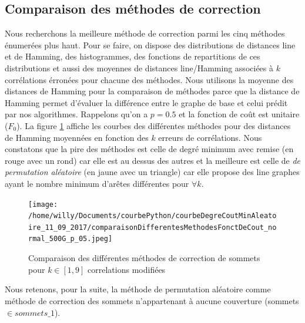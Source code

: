 \documentclass[onecolumn, 12pt]{book}
\begin{document}
\subsection{Comparaison des m\'ethodes de correction}
Nous recherchons la meilleure m\'ethode de correction parmi les cinq m\'ethodes \'enumer\'ees plus haut. 
Pour se faire, on dispose des distributions de distances line et de Hamming, des histogrammes, des fonctions de repartitions de ces distributions et aussi des moyennes de distances line/Hamming associ\'ees \`a $k$ corr\'elations \'erron\'ees pour chacune des m\'ethodes.  
Nous utilisons la moyenne des distances de Hamming pour la comparaison de m\'ethodes parce que la distance de Hamming permet d'\'evaluer la diff\'erence entre le graphe de base et celui pr\'edit par nos algorithmes.\newline
Rappelons qu'on a $p=0.5$ et la fonction de co\^ut est unitaire ($F_0$).
La figure \ref{compareDifferentesMethodesCorrectionSommets_fct_cout_unitaire_p05} affiche les courbes  des diff\'erentes m\'ethodes pour des distances de Hamming moyenn\'ees en fonction des $k$ erreurs de corr\'elations.
\newline
Nous constatons  que la pire des m\'ethodes est celle de degr\'e minimum avec remise (en rouge avec un rond) car elle est au dessus des autres et la meilleure est celle de {\em de permutation al\'eatoire} (en jaune avec un triangle) car elle propose des line graphes ayant  le nombre minimum d'ar\^etes diff\'erentes pour $ \forall k$.\newline
\begin{centering} 
\begin{figure}[htb!] 
\texttt{[image: /home/willy/Documents/courbePython/courbeDegreCoutMinAleatoire\_11\_09\_2017/comparaisonDifferentesMethodesFonctDeCout\_normal\_500G\_p\_05.jpeg]}
\caption{ Comparaison des diff\'erentes m\'ethodes de correction de sommets pour $k \in [1,9]$ correlations modifi\'ees }
\label{compareDifferentesMethodesCorrectionSommets_fct_cout_unitaire_p05} 
\end{figure}
\end{centering} 
Nous retenons, pour la suite, la m\'ethode de permutation al\'eatoire comme m\'ethode de correction des sommets n'appartenant \`a aucune couverture (sommets $\in sommets\_1$).
\newline
\end{document}
